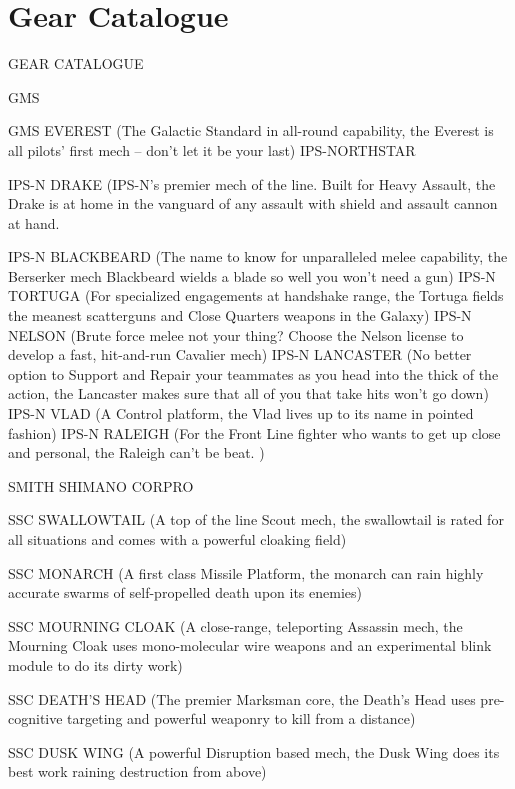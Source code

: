 \chapter{Gear Catalogue}
 GEAR CATALOGUE  

                                                GMS  

GMS EVEREST (The Galactic Standard in all-round capability, the Everest is all pilots’ first mech  
-- don’t let it be your last)  
                                    IPS-NORTHSTAR  

IPS-N DRAKE (IPS-N’s premier mech of the line. Built for Heavy Assault, the Drake is at home  
in the vanguard of any assault with shield and assault cannon at hand.
 
IPS-N BLACKBEARD (The name to know for unparalleled melee capability, the Berserker mech  
Blackbeard wields a blade so well you won’t need a gun)  
IPS-N TORTUGA (For specialized engagements at handshake range, the Tortuga fields the  
meanest scatterguns and Close Quarters weapons in the Galaxy)  
IPS-N NELSON (Brute force melee not your thing? Choose the Nelson license to develop a fast,  
hit-and-run Cavalier mech)  
IPS-N LANCASTER (No better option to Support and Repair your teammates as you head into  
the thick of the action, the Lancaster makes sure that all of you that take hits won’t go down)  
IPS-N VLAD (A Control platform, the Vlad lives up to its name in pointed fashion)  
IPS-N RALEIGH (For the Front Line fighter who wants to get up close and personal, the Raleigh  
can’t be beat. )  

                           SMITH SHIMANO CORPRO  

SSC SWALLOWTAIL (A top of the line Scout mech, the swallowtail is rated for all situations and  
comes with a powerful cloaking field)
 
SSC MONARCH (A first class Missile Platform, the monarch can rain highly accurate swarms of  
self-propelled death upon its enemies)
 
SSC MOURNING CLOAK (A close-range, teleporting Assassin mech, the Mourning Cloak uses  
mono-molecular wire weapons and an experimental blink module to do its dirty work)
 
SSC DEATH’S HEAD (The premier Marksman core, the Death’s Head uses pre-cognitive  
targeting and powerful weaponry to kill from a distance)
 
SSC DUSK WING (A powerful Disruption based mech, the Dusk Wing does its best work  
raining destruction from above)
 

